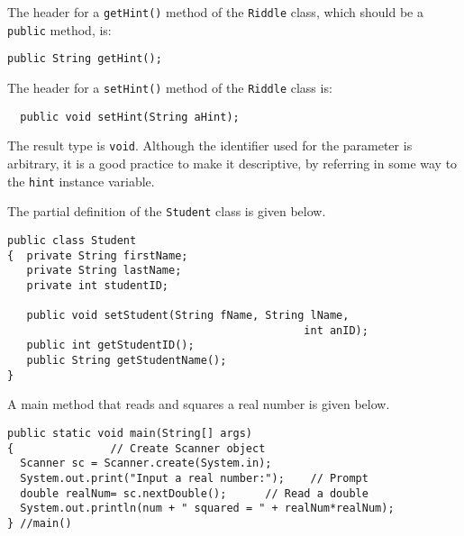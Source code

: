 \begin{ANS}
\item
The header for a {\tt getHint()} method of the {\tt Riddle} class,
which should be a {\tt public} method, is:

\begin{jjjlisting}
\begin{lstlisting}
public String getHint();
\end{lstlisting}
\end{jjjlisting}


\item
The header for a {\tt setHint()} method of the {\tt Riddle} class is:

\begin{jjjlisting}
\begin{lstlisting}
  public void setHint(String aHint);
\end{lstlisting}
\end{jjjlisting}

The result type is {\tt void}.  Although the identifier used for the
parameter is arbitrary, it is a good practice to make it descriptive,
by referring in some way to the {\tt hint} instance variable.

\item
The partial definition of the {\tt Student} class is given below.

\begin{jjjlisting}
\begin{lstlisting}
public class Student
{  private String firstName;
   private String lastName;
   private int studentID;

   public void setStudent(String fName, String lName, 
                                              int anID);
   public int getStudentID();
   public String getStudentName();
}
\end{lstlisting}
\end{jjjlisting}

\item
A main method that reads and squares a real number is given below.
\begin{jjjlisting}[27pc]
\begin{lstlisting}
public static void main(String[] args) 
{               // Create Scanner object
  Scanner sc = Scanner.create(System.in); 
  System.out.print("Input a real number:");    // Prompt
  double realNum= sc.nextDouble();      // Read a double
  System.out.println(num + " squared = " + realNum*realNum);
} //main()
\end{lstlisting}
\end{jjjlisting}

\end{ANS}

